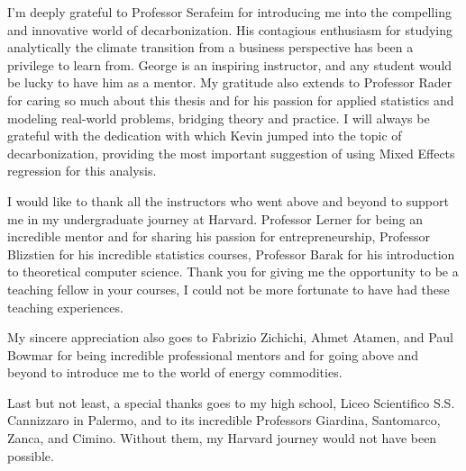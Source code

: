 
I'm deeply grateful to Professor Serafeim for introducing me into the compelling and innovative world of decarbonization. His contagious enthusiasm for studying analytically the climate transition from a business perspective has been a privilege to learn from. George is an inspiring instructor, and any student would be lucky to have him as a mentor. My gratitude also extends to Professor Rader for caring so much about this thesis and for his passion for applied statistics and modeling real-world problems, bridging theory and practice. I will always be grateful with the dedication with which Kevin jumped into the topic of decarbonization, providing the most important suggestion of using Mixed Effects regression for this analysis. 

I would like to thank all the instructors who went above and beyond to support me in my undergraduate journey at Harvard. Professor Lerner for being an incredible mentor and for sharing his passion for entrepreneurship, Professor Blizstien for his incredible statistics courses, Professor Barak for his introduction to theoretical computer science. Thank you for giving me the opportunity to be a teaching fellow in your courses, I could not be more fortunate to have had these teaching experiences.

My sincere appreciation also goes to Fabrizio Zichichi, Ahmet Atamen, and Paul Bowmar for being incredible professional mentors and for going above and beyond to introduce me to the world of energy commodities. 

Last but not least, a special thanks goes to my high school, Liceo Scientifico S.S. Cannizzaro in Palermo, and to its incredible Professors Giardina, Santomarco, Zanca, and Cimino. Without them, my Harvard journey would not have been possible.


